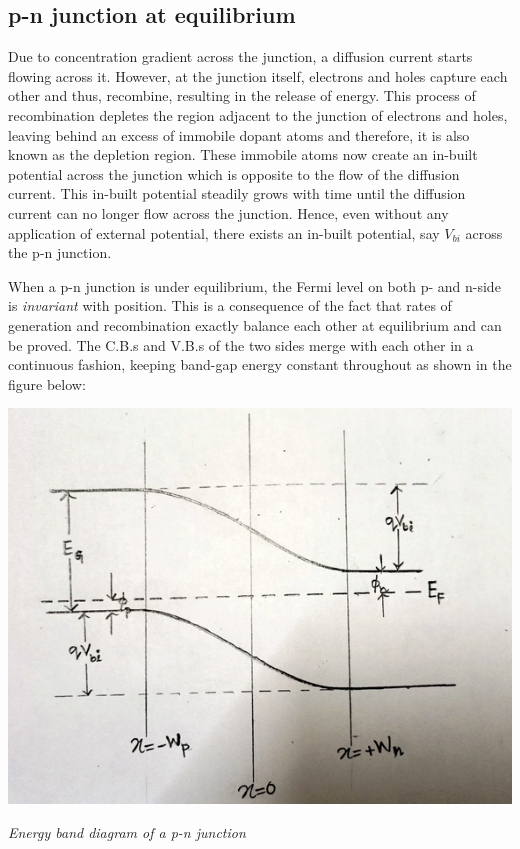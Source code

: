 \documentclass[12 pt]{article}
\begin{document}
\subsection{p-n junction at equilibrium}

Due to concentration gradient across the junction, a diffusion current starts flowing across it. However, at the junction itself, electrons and holes capture each other and thus, recombine, resulting in the release of energy. This process of recombination depletes the region adjacent to the junction of electrons and holes, leaving behind an excess of immobile dopant atoms and therefore, it is also known as the depletion region. These immobile atoms now create an in-built potential across the junction which is opposite to the flow of the diffusion current. This in-built potential steadily grows with time until the diffusion current can no longer flow across the junction. Hence, even without any application of external potential, there exists an in-built potential, say $V_{bi}$ across the p-n junction.\par

When a p-n junction is under equilibrium, the Fermi level on both p- and n-side is \emph{invariant} with position. This is a consequence of the fact that rates of generation and recombination exactly balance each other at equilibrium and can be proved. The C.B.s and V.B.s of the two sides merge with each other in a continuous fashion, keeping band-gap energy constant throughout as shown in the figure below: \newline

 \par
  \begin{center}
   \includegraphics{hand_drawn_2_45.jpg}
     \end{center}
   \begin{center}
       \emph{\hspace{2cm}Energy band diagram of a p-n junction\newline}
   \end{center}
\par
\end{document}
